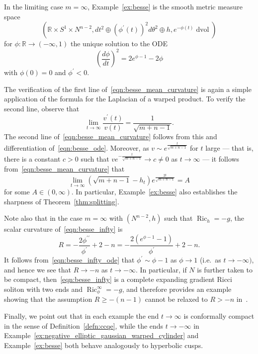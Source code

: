 \documentclass{amsart}
\theoremstyle{definition}
\theoremstyle{remark}
\numberwithin{equation}{section}
\begin{document}
In the limiting case $m=\infty$, Example~\ref{ex:besse} is the smooth metric measure space
\begin{equation}
\label{eqn:besse_infty}
\left( {\mathbb{R}}\times S^1\times N^{n-2}, dt^2\oplus\left(\phi^\prime(t)\right)^2d\theta^2\oplus h, e^{-\phi(t)}\operatorname{dvol} \right)
\end{equation}
for $\phi\colon{\mathbb{R}}\to(-\infty,1)$ the unique solution to the ODE
\begin{equation}
\label{eqn:besse_infty_ode}
\left(\frac{d\phi}{dt}\right)^2 = 2e^{\phi-1} - 2\phi
\end{equation}
with $\phi(0)=0$ and $\phi^\prime<0$.

The verification of the first line of~\eqref{eqn:besse_mean_curvature} is again a simple application of the formula for the Laplacian of a warped product.  To verify the second line, observe that
\[ \lim_{t\to\infty}\frac{v^\prime(t)}{v(t)} = \frac{1}{\sqrt{m+n-1}} . \]
The second line of~\eqref{eqn:besse_mean_curvature} follows from this and differentiation of~\eqref{eqn:besse_ode}.  Moreover, as $v\sim e^{\frac{t}{\sqrt{m+n-1}}}$ for $t$ large --- that is, there is a constant $c>0$ such that $ve^{-\frac{t}{\sqrt{m+n-1}}}\to c\not=0$ as $t\to\infty$ --- it follows from~\eqref{eqn:besse_mean_curvature} that
\[ \lim_{t\to\infty}\left(\sqrt{m+n-1}-h_t\right)e^{\frac{2t}{\sqrt{m+n-1}}} = A \]
for some $A\in(0,\infty)$.  In particular, Example~\ref{ex:besse} also establishes the sharpness of Theorem~\ref{thm:splitting}.

Note also that in the case $m=\infty$ with $(N^{n-2},h)$ such that $\operatorname{Ric}_h=-g$, the scalar curvature of~\eqref{eqn:besse_infty} is
\[ R = -\frac{2\phi^{\prime\prime}}{\phi^\prime} + 2 - n = -\frac{2(e^{\phi-1}-1)}{\phi^\prime} + 2 - n . \]
It follows from~\eqref{eqn:besse_infty_ode} that $\phi^\prime\sim\phi-1$ as $\phi\to1$ (i.e.\ as $t\to-\infty)$, and hence we see that $R\to-n$ as $t\to-\infty$.  In particular, if $N$ is further taken to be compact, then~\eqref{eqn:besse_infty} is a complete expanding gradient Ricci soliton with two ends and $\operatorname{Ric}_\phi^\infty=-g$, and therefore provides an example showing that the assumption $R\geq-(n-1)$ cannot be relaxed to $R>-n$ in~\cite[Theorem~1.4]{MunteanuWang2011b}.

Finally, we point out that in each example the end $t\to\infty$ is conformally compact in the sense of Definition~\ref{defn:ccqe}, while the ends $t\to-\infty$ in Example~\ref{ex:negative_elliptic_gaussian_warped_cylinder} and Example~\ref{ex:besse} both behave analogously to hyperbolic cusps.
\end{document}
